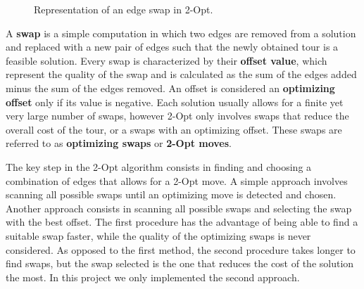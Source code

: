 \begin{figure}[htbp]
    \centering
    \caption{Representation of an edge swap in 2-Opt.}
    \label{fig:2optMoves}
\end{figure}

A \textbf{swap} is a simple computation in which two edges are removed from a solution and replaced with a new pair of edges such that the newly obtained tour is a feasible solution.
Every swap is characterized by their \textbf{offset value}, which represent the quality of the swap and is calculated as the sum of the edges added minus the sum of the edges removed.
An offset is considered an \textbf{optimizing offset} only if its value is negative.
Each solution usually allows for a finite yet very large number of swaps, however 2-Opt only involves swaps that reduce the overall cost of the tour, or a swaps with an optimizing offset.
These swaps are referred to as \textbf{optimizing swaps} or \textbf{2-Opt moves}.

The key step in the 2-Opt algorithm consists in finding and choosing a combination of edges that allows for a 2-Opt move.
A simple approach involves scanning all possible swaps until an optimizing move is detected and chosen.
Another approach consists in scanning all possible swaps and selecting the swap with the best offset.
The first procedure has the advantage of being able to find a suitable swap faster, while the quality of the optimizing swaps is never considered.
As opposed to the first method, the second procedure takes longer to find swaps, but the swap selected is the one that reduces the cost of the solution the most.
In this project we only implemented the second approach.

